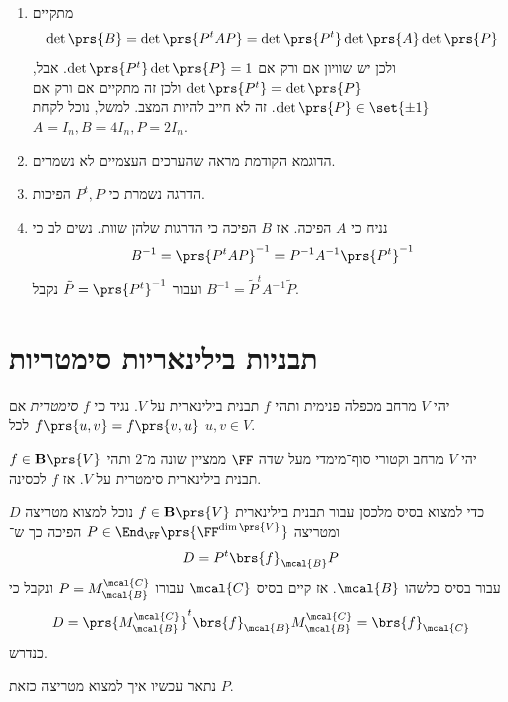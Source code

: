 \documentclass[a4paper,10pt,twoside,openany]{book}
\begin{document}
\begin{solution}
\begin{enumerate}
\item מתקיים
\[\det\prs{B} = \det\prs{P^t A P} = \det\prs{P^t} \det\prs{A} \det\prs{P}\]
ולכן יש שוויון אם ורק אם
$\det\prs{P^t} \det\prs{P} = 1$.
אבל,
$\det\prs{P^t} = \det\prs{P}$
ולכן זה מתקיים אם ורק אם
$\det\prs{P} \in \set{\pm 1}$.
זה לא חייב להיות המצב. למשל, נוכל לקחת
$A = I_n, B = 4I_n, P = 2I_n$.

\item הדוגמא הקודמת מראה שהערכים העצמיים לא נשמרים.

\item הדרגה נשמרת כי
$P^t, P$
הפיכות.

\item נניח כי
$A$
הפיכה. אז
$B$
הפיכה כי הדרגות שלהן שוות.
נשים לב כי
\[B^{-1} = \prs{P^t A P}^{-1} = P^{-1} A^{-1} \prs{P^t}^{-1}\]
ועבור
$\tilde{P} = \prs{P^t}^{-1}$
נקבל
$B^{-1} = \tilde{P}^t A^{-1} \tilde{P}$.
\end{enumerate}
\end{solution}

\section{תבניות בילינאריות סימטריות}

\begin{definition}
יהי
$V$
מרחב מכפלה פנימית ותהי
$f$
תבנית בילינארית על
$V$.
נגיד כי
$f$
\emph{סימטרית}
אם
$f\prs{u,v} = f\prs{v,u}$
לכל
$u,v \in V$.
\end{definition}

\begin{theorem}
יהי
$V$
מרחב וקטורי סוף־מימדי מעל שדה
$\FF$
ממציין שונה מ־$2$
ותהי
$f \in \mathbf{B}\prs{V}$
תבנית בילינארית סימטרית על
$V$.
אז
$f$
לכסינה.
\end{theorem}

כדי למצוא בסיס מלכסן עבור תבנית בילינארית
$f \in \mathbf{B}\prs{V}$
נוכל למצוא מטריצה
$D$
ומטריצה
$P \in \End_\FF\prs{\FF^{\dim\prs{V}}}$
הפיכה כך ש־%
\[D = P^t \brs{f}_\mcal{B} P\]
עבור בסיס כלשהו
$\mcal{B}$.
אז קיים בסיס
$\mcal{C}$
עבורו
$P = M^{\mcal{C}}_{\mcal{B}}$
ונקבל כי
\begin{align*}
D = \prs{M^{\mcal{C}}_\mcal{B}}^t \brs{f}_{\mcal{B}} M^{\mcal{C}}_{\mcal{B}} = \brs{f}_{\mcal{C}}
\end{align*}
כנדרש.

נתאר עכשיו איך למצוא מטריצה כזאת
$P$.
\end{document}
